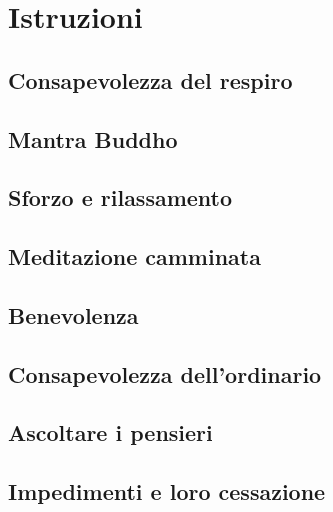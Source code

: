 \documentclass[11pt,twoside,final]{memoir}
\begin{document}

\part{Istruzioni}

\chapter{Consapevolezza del respiro}


\chapter{Mantra Buddho}


\chapter{Sforzo e rilassamento}


\chapter{Meditazione camminata}


\chapter{Benevolenza}


\chapter{Consapevolezza dell'ordinario}


\chapter{Ascoltare i pensieri}


\chapter{Impedimenti e loro cessazione}

\end{document}
